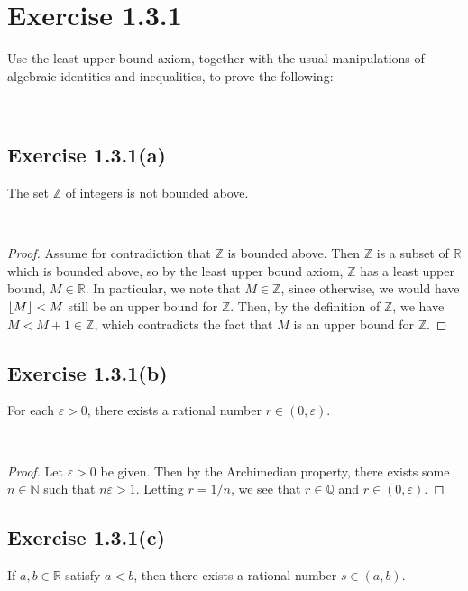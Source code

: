 \documentclass[12pt]{article}
\newcommand{\N}{\mathbb{N}}
\newcommand{\Z}{\mathbb{Z}}
\newcommand{\R}{\mathbb{R}}
\newcommand{\Q}{\mathbb{Q}}
\newcommand{\eps}{\varepsilon}
\DeclarePairedDelimiter\floor{\lfloor}{\rfloor}
\newenvironment{problem}
    {\begin{lrbox}{\mybox}\begin{minipage}{\textwidth-10pt}}
    {\end{minipage}\end{lrbox}\framebox[6.5in]{\usebox{\mybox}}\\}
\begin{document}
\section*{Exercise 1.3.1}
\begin{problem}
    Use the least upper bound axiom, together with the usual manipulations of algebraic identities and inequalities, to prove the following:
\end{problem}

\subsection*{Exercise 1.3.1(a)}
\begin{problem}
    The set $\Z$ of integers is not bounded above.
\end{problem}

\begin{proof}
    Assume for contradiction that $\Z$ is bounded above. Then $\Z$ is a subset of $\R$ which is bounded above, so by the least upper bound axiom, $\Z$ has a least upper bound, $M\in\R$. In particular, we note that $M\in\Z$, since otherwise, we would have $\floor{M}<M$ still be an upper bound for $\Z$. Then, by the definition of $\Z$, we have $M<M+1\in\Z$, which contradicts the fact that $M$ is an upper bound for $\Z$.
    
\end{proof}

\subsection*{Exercise 1.3.1(b)}
\begin{problem}
    For each $\eps>0$, there exists a rational number $r\in(0,\eps)$.
\end{problem}

\begin{proof}
    Let $\eps>0$ be given. Then by the Archimedian property, there exists some $n\in\N$ such that $n\eps > 1$. Letting $r=1/n$, we see that $r\in\Q$ and $r\in(0,\eps)$.
    
\end{proof}

\subsection*{Exercise 1.3.1(c)}
\begin{problem}
    If $a,b\in\R$ satisfy $a<b$, then there exists a rational number $s\in(a,b)$.
\end{problem}
\end{document}
